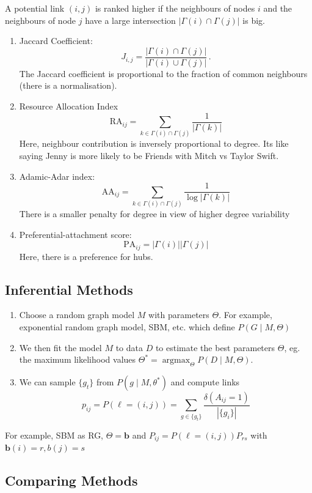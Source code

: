 \documentclass[12pt]{article}
\theoremstyle{definition}
\newcommand{\br}[1]{\left({#1}\right)}
\newcommand{\abs}[1]{\left|{#1}\right|}
\begin{document}
A potential link $(i,j)$ is ranked higher if the neighbours of nodes $i$ and the neighbours of node $j$ have a large intersection $|\Gamma(i)\cap \Gamma(j)|$ is big. 

\begin{enumerate}
    \item Jaccard Coefficient: 
    \[ J_{i,j} = \frac{|\Gamma(i)\cap \Gamma(j)|}{|\Gamma(i)\cup \Gamma(j)|}\,.\]
    The Jaccard coefficient is proportional to the fraction of common neighbours (there is a normalisation). 
    \item Resource Allocation Index
    \[
        \mathrm{RA}_{ij} = \sum_{k\in \Gamma(i)\cap\Gamma(j)} \frac{1}{\abs{\Gamma(k)}}
    \]
    Here, neighbour contribution is inversely proportional to degree. Its like saying Jenny is more likely to be Friends with Mitch vs Taylor Swift.
    \item Adamic-Adar index:
    \[
        \mathrm{AA}_{ij} = \sum_{k\in \Gamma(i)\cap\Gamma(j)} \frac{1}{\log{\abs{\Gamma(k)}}}
    \]
    There is a smaller penalty for degree in view of higher degree variability 
    \item Preferential-attachment score: 
    \[
    \mathrm{PA}_{ij}=|\Gamma(i)||\Gamma(j)|
    \]
    Here, there is a preference for hubs. 
\end{enumerate}

\subsection{Inferential Methods}

\begin{enumerate}
    \item Choose a random graph model  $M$ with parameters $\Theta$. For example, exponential random graph model, SBM, etc. which define $P(G\mid M,\Theta)$
    \item We then fit the model $M$ to data $D$ to estimate the best parameters $\Theta$, eg. the maximum likelihood values $\Theta^* = \operatorname{argmax}_{\Theta}P(D\mid M,\Theta)$.
    \item We can sample $\{g_t\}$ from $P(g\mid M,\theta^*)$ and compute links
    \[
    p_{ij}=P(\ell=(i,j))=\sum_{g\in\{g_t\}}\frac{\delta(A_{ij}=1)}{|\{g_i\}|}
    \]
\end{enumerate}
For example, SBM as RG, $\Theta = \boldsymbol{b}$ and $P_{ij} = P\br{\ell=\br{i,j}} P_{rs}$ with $\boldsymbol{b}(i) =r,b(j) = s$

\subsection{Comparing Methods}
\end{document}
